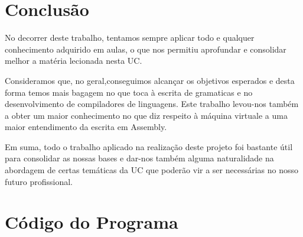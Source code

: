 \documentclass[11pt,a4paper]{report}%
\begin{document}
\chapter{Conclusão}
No decorrer deste trabalho, tentamos sempre aplicar todo e qualquer conhecimento adquirido em aulas, o que nos permitiu aprofundar e consolidar melhor a matéria lecionada nesta UC.

Consideramos que, no geral,conseguimos alcançar os objetivos esperados e desta forma temos mais bagagem no que toca à escrita de gramaticas e no desenvolvimento de compiladores de linguagens.
Este trabalho levou-nos também a obter um maior conhecimento no que diz respeito à máquina virtuale a uma maior entendimento da escrita em Assembly.

Em suma, todo o trabalho aplicado na realização deste projeto foi bastante útil para consolidar as nossas bases e dar-nos também alguma naturalidade na abordagem de certas temáticas da UC que poderão vir a ser necessárias no nosso futuro profissional.

\appendix %
\chapter{Código do Programa}
\end{document}

